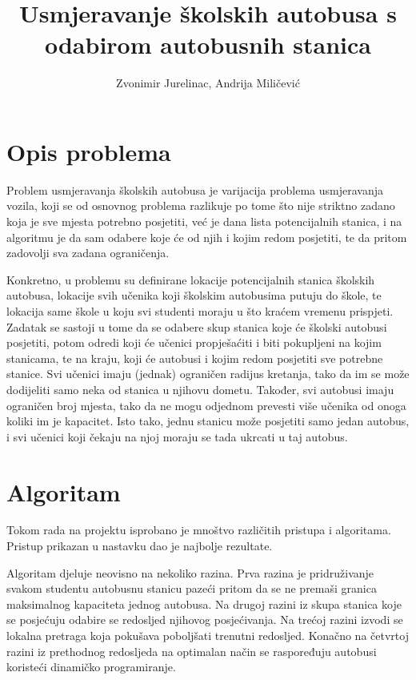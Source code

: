 \documentclass[times, utf8, seminar, numeric]{fer}
\begin{document}
\nocite{*}

\title{Usmjeravanje školskih autobusa s odabirom autobusnih stanica}

\author{Zvonimir Jurelinac, Andrija Miličević}


\maketitle

\tableofcontents

\chapter{Opis problema}
Problem usmjeravanja školskih autobusa je varijacija problema usmjeravanja vozila, koji se od osnovnog problema razlikuje po tome što nije striktno zadano koja je sve mjesta potrebno posjetiti, već je dana lista potencijalnih stanica, i na algoritmu je da sam odabere koje će od njih i kojim redom posjetiti, te da pritom zadovolji sva zadana ograničenja.

Konkretno, u problemu su definirane lokacije potencijalnih stanica školskih autobusa, lokacije svih učenika koji školskim autobusima putuju do škole, te lokacija same škole u koju svi studenti moraju u što kraćem vremenu prispjeti. Zadatak se sastoji u tome da se odabere skup stanica koje će školski autobusi posjetiti, potom odredi koji će učenici propješaćiti i biti pokupljeni na kojim stanicama, te na kraju, koji će autobusi i kojim redom posjetiti sve potrebne stanice. Svi učenici imaju (jednak) ograničen radijus kretanja, tako da im se može dodijeliti samo neka od stanica u njihovu dometu. Također, svi autobusi imaju ograničen broj mjesta, tako da ne mogu odjednom prevesti više učenika od onoga koliki im je kapacitet. Isto tako, jednu stanicu može posjetiti samo jedan autobus, i svi učenici koji čekaju na njoj moraju se tada ukrcati u taj autobus.

\chapter{Algoritam}
Tokom rada na projektu isprobano je mnoštvo različitih pristupa i algoritama. Pristup prikazan u nastavku dao je najbolje rezultate.

Algoritam djeluje neovisno na nekoliko razina. Prva razina je pridruživanje svakom studentu autobusnu stanicu pazeći pritom da se ne premaši granica maksimalnog kapaciteta jednog autobusa. Na drugoj razini iz skupa stanica koje se posjećuju odabire se redosljed njihovog posjećivanja. Na trećoj razini izvodi se lokalna pretraga koja pokušava poboljšati trenutni redosljed. Konačno na četvrtoj razini iz prethodnog redosljeda na optimalan način se raspoređuju autobusi koristeći dinamičko programiranje.
\end{document}
